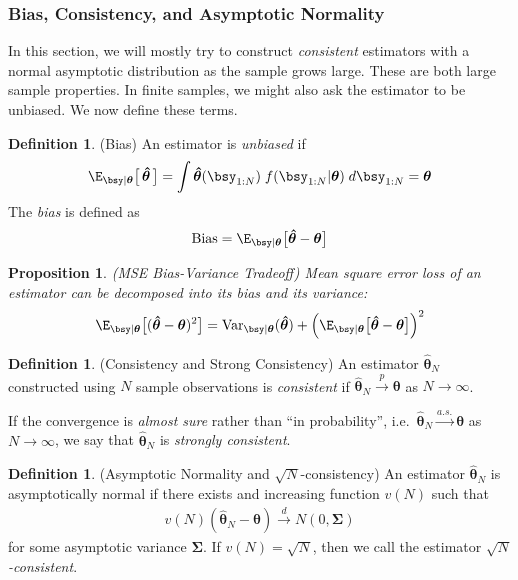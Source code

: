 \documentclass[12pt]{article}
\theoremstyle{plain}
\newtheorem{prop}[thm]{Proposition}
\theoremstyle{definition}
\newtheorem{defn}[thm]{Definition}
\theoremstyle{remark}
\newcommand{\ra}{\rightarrow}
\newcommand{\bstheta}{\boldsymbol{\theta}}
\newcommand{\bsSigma}{\boldsymbol{\Sigma}}
\newcommand{\bshattheta}{\boldsymbol{\hat{\theta}}}
\newcommand{\Var}{\operatorname{Var}}
\newcommand{\asto}{\xrightarrow{a.s.}}
\newcommand{\pto}{\xrightarrow{p}}
\newcommand{\dto}{\xrightarrow{d}}
\begin{document}
\clearpage
\subsubsection{Bias, Consistency, and Asymptotic Normality}

In this section, we will mostly try to construct \emph{consistent}
estimators with a normal asymptotic distribution as the sample grows
large. These are both large sample properties. In finite samples, we
might also ask the estimator to be unbiased. We now define these terms.

\begin{defn}(Bias)
An estimator is \emph{unbiased} if
\begin{align*}
  \E_{\bsy|\bstheta}\big[\,\bshattheta\,\big]
  =
  \int
    \bshattheta(\bsy_{1:N}) \;
    f(\bsy_{1:N}|\bstheta) \; d\bsy_{1:N} = \bstheta
\end{align*}
The \emph{bias} is defined as
\begin{align*}
  \text{Bias} = \E_{\bsy|\bstheta}\big[\bshattheta-\bstheta\big]
\end{align*}
\end{defn}

\begin{prop}\emph{(MSE Bias-Variance Tradeoff)}
Mean square error loss of an estimator can be decomposed into its bias
and its variance:
\begin{align*}
  \E_{\bsy|\bstheta}\big[(\bshattheta-\bstheta)^2\big]
  =\Var_{\bsy|\bstheta}(\bshattheta) +
  \left(\E_{\bsy|\bstheta}\big[\bshattheta-\bstheta\big]\right)^2
\end{align*}
\end{prop}

\begin{defn}(Consistency and Strong Consistency)
An estimator $\bshattheta_N$ constructed using $N$ sample observations
is \emph{consistent} if $\bshattheta_N\pto \bstheta$ as $N\ra\infty$.

If the convergence is \emph{almost sure} rather than ``in probability'',
i.e.\ $\bshattheta_N\asto \bstheta$ as $N\ra\infty$, we say that
$\bshattheta_N$ is \emph{strongly consistent}.
\end{defn}


\begin{defn}(Asymptotic Normality and $\sqrt{N}$-consistency)
An estimator $\bshattheta_N$ is asymptotically normal if there exists
and increasing function $v(N)$ such that
\begin{align*}
  v(N)(\bshattheta_N -\bstheta) \dto N(0,\bsSigma)
\end{align*}
for some asymptotic variance $\bsSigma$. If $v(N)=\sqrt{N}$, then we
call the estimator \emph{$\sqrt{N}$-consistent}.
\end{defn}
\end{document}
